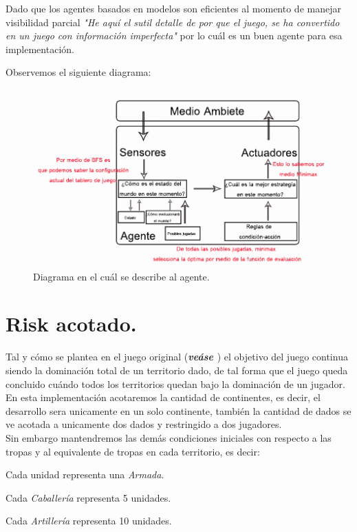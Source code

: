 \documentclass[12pt]{article}
\begin{document}
Dado que los agentes basados en modelos son eficientes al momento de manejar visibilidad parcial\cite{russell2004inteligencia} \textit{"He aqu\'i el sutil detalle de por que el juego, se ha convertido en un juego con informaci\'on imperfecta"} por lo cu\'al es un buen agente para esa implementaci\'on.

Observemos el siguiente diagrama:

\begin{figure}[htp]
\centering
\includegraphics{agente-diagrama.pdf}
\caption{Diagrama en el cu\'al se describe al agente.}
\label{agente_modelos}
\end{figure}




\section{Risk acotado.}

Tal y c\'omo se plantea en el juego original (\textbf{\textit{ve\'ase \cite{RISK}}}) el objetivo del juego continua siendo la dominaci\'on total de un territorio dado, de tal forma
que el juego queda concluido cu\'ando todos los territorios quedan bajo la dominaci\'on de 
un jugador.\\
En esta implementaci\'on acotaremos la cantidad de continentes, es decir, el desarrollo sera unicamente en un solo continente, tambi\'en la cantidad de dados se ve acotada a unicamente dos dados y restringido a dos jugadores.\\

Sin embargo mantendremos las dem\'as condiciones iniciales con respecto a las tropas y al equivalente de tropas en cada territorio, es decir:
\begin{list}{*}{}
\item Cada unidad representa una \textit{Armada}.
\item Cada \textit{Caballer\'ia} representa 5 unidades.
\item Cada \textit{Artiller\'ia} representa 10 unidades.
\end{list}
\end{document}
